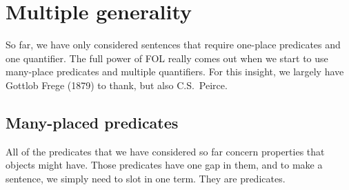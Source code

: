 

\chapter{Multiple generality}\label{s:MultipleGenerality}
So far, we have only considered sentences that require one-place predicates and one quantifier. The full power of FOL really comes out when we start to use many-place predicates and multiple quantifiers. For this insight, we largely have Gottlob Frege (1879) to thank, but also C.S.~Peirce.


\section{Many-placed predicates}
All of the predicates that we have considered so far concern properties that objects might have. Those predicates have one gap in them, and to make a sentence, we simply need to slot in one term. They are  predicates.

